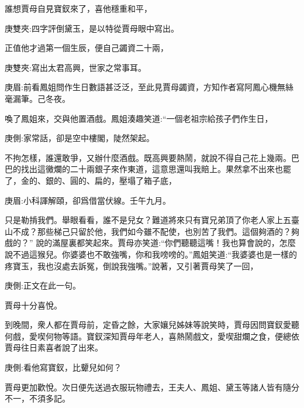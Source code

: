 \begin{parag}
    誰想賈母自見寶釵來了，喜他穩重和平，\begin{note}庚雙夾:四字評倒黛玉，是以特從賈母眼中寫出。\end{note}正值他才過第一個生辰，便自己蠲資二十兩，\begin{note}庚雙夾:寫出太君高興，世家之常事耳。\end{note}\begin{note}庚眉:前看鳳姐問作生日數語甚泛泛，至此見賈母蠲資，方知作者寫阿鳳心機無絲毫漏筆。己冬夜。\end{note}喚了鳳姐來，交與他置酒戲。鳳姐湊趣笑道:“一個老祖宗給孩子們作生日，\begin{note}庚側:家常話，卻是空中樓閣，陡然架起。\end{note}不拘怎樣，誰還敢爭，又辦什麼酒戲。既高興要熱鬧，就說不得自己花上幾兩。巴巴的找出這黴爛的二十兩銀子來作東道，這意思還叫我賠上。果然拿不出來也罷了，金的、銀的、圓的、扁的，壓塌了箱子底，\begin{note}庚眉:小科諢解頤，卻爲借當伏線。壬午九月。\end{note}只是勒掯我們。舉眼看看，誰不是兒女？難道將來只有寶兄弟頂了你老人家上五臺山不成？那些梯己只留於他，我們如今雖不配使，也別苦了我們。這個夠酒的？夠戲的？” 說的滿屋裏都笑起來。賈母亦笑道:“你們聽聽這嘴！我也算會說的，怎麼說不過這猴兒。你婆婆也不敢強嘴，你和我嗙嗙的。”鳳姐笑道:“我婆婆也是一樣的疼寶玉，我也沒處去訴冤，倒說我強嘴。”說著，又引著賈母笑了一回，\begin{note}庚側:正文在此一句。\end{note}賈母十分喜悅。
\end{parag}


\begin{parag}
    到晚間，衆人都在賈母前，定昏之餘，大家孃兒姊妹等說笑時，賈母因問寶釵愛聽何戲，愛喫何物等語。寶釵深知賈母年老人，喜熱鬧戲文，愛喫甜爛之食，便總依賈母往日素喜者說了出來。\begin{note}庚側:看他寫寶釵，比顰兒如何？\end{note}賈母更加歡悅。次日便先送過衣服玩物禮去，王夫人、鳳姐、黛玉等諸人皆有隨分不一，不須多記。
\end{parag}


